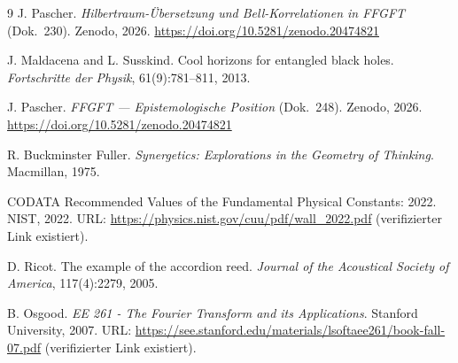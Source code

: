 	\begin{thebibliography}{9}
	J. Pascher.
	\newblock \emph{Hilbertraum-Übersetzung und Bell-Korrelationen in FFGFT} (Dok.~230).
	\newblock Zenodo, 2026.
	\newblock \url{https://doi.org/10.5281/zenodo.20474821}

	J. Maldacena and L. Susskind.
	\newblock Cool horizons for entangled black holes.
	\newblock \emph{Fortschritte der Physik}, 61(9):781--811, 2013.

	J. Pascher.
	\newblock \emph{FFGFT --- Epistemologische Position} (Dok.~248).
	\newblock Zenodo, 2026.
	\newblock \url{https://doi.org/10.5281/zenodo.20474821}

		R. Buckminster Fuller.
		\newblock \emph{Synergetics: Explorations in the Geometry of Thinking}.
		\newblock Macmillan, 1975.
		
		CODATA Recommended Values of the Fundamental Physical Constants: 2022.
		\newblock NIST, 2022.
		\newblock URL: \url{https://physics.nist.gov/cuu/pdf/wall_2022.pdf}
		(verifizierter Link existiert).
		
		D. Ricot.
		\newblock The example of the accordion reed.
		\newblock \emph{Journal of the Acoustical Society of America}, 117(4):2279, 2005.
		
		B. Osgood.
		\newblock \emph{EE 261 - The Fourier Transform and its Applications}.
		\newblock Stanford University, 2007.
		\newblock URL: \url{https://see.stanford.edu/materials/lsoftaee261/book-fall-07.pdf}
		(verifizierter Link existiert).
	\end{thebibliography}